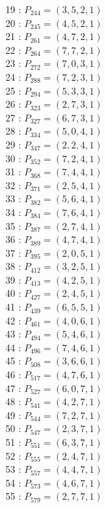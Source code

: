 \documentclass{article}
\begin{document}
{\begin{multicols}{2}
19 : $P_{244}=( 3, 5, 2, 1 )$\\
20 : $P_{245}=( 4, 5, 2, 1 )$\\
21 : $P_{261}=( 4, 7, 2, 1 )$\\
22 : $P_{264}=( 7, 7, 2, 1 )$\\
23 : $P_{272}=( 7, 0, 3, 1 )$\\
24 : $P_{288}=( 7, 2, 3, 1 )$\\
25 : $P_{294}=( 5, 3, 3, 1 )$\\
26 : $P_{323}=( 2, 7, 3, 1 )$\\
27 : $P_{327}=( 6, 7, 3, 1 )$\\
28 : $P_{334}=( 5, 0, 4, 1 )$\\
29 : $P_{347}=( 2, 2, 4, 1 )$\\
30 : $P_{352}=( 7, 2, 4, 1 )$\\
31 : $P_{368}=( 7, 4, 4, 1 )$\\
32 : $P_{371}=( 2, 5, 4, 1 )$\\
33 : $P_{382}=( 5, 6, 4, 1 )$\\
34 : $P_{384}=( 7, 6, 4, 1 )$\\
35 : $P_{387}=( 2, 7, 4, 1 )$\\
36 : $P_{389}=( 4, 7, 4, 1 )$\\
37 : $P_{395}=( 2, 0, 5, 1 )$\\
38 : $P_{412}=( 3, 2, 5, 1 )$\\
39 : $P_{413}=( 4, 2, 5, 1 )$\\
40 : $P_{427}=( 2, 4, 5, 1 )$\\
41 : $P_{439}=( 6, 5, 5, 1 )$\\
42 : $P_{461}=( 4, 0, 6, 1 )$\\
43 : $P_{494}=( 5, 4, 6, 1 )$\\
44 : $P_{496}=( 7, 4, 6, 1 )$\\
45 : $P_{508}=( 3, 6, 6, 1 )$\\
46 : $P_{517}=( 4, 7, 6, 1 )$\\
47 : $P_{527}=( 6, 0, 7, 1 )$\\
48 : $P_{541}=( 4, 2, 7, 1 )$\\
49 : $P_{544}=( 7, 2, 7, 1 )$\\
50 : $P_{547}=( 2, 3, 7, 1 )$\\
51 : $P_{551}=( 6, 3, 7, 1 )$\\
52 : $P_{555}=( 2, 4, 7, 1 )$\\
53 : $P_{557}=( 4, 4, 7, 1 )$\\
54 : $P_{573}=( 4, 6, 7, 1 )$\\
55 : $P_{579}=( 2, 7, 7, 1 )$\\
\end{multicols}
}
\end{document}

